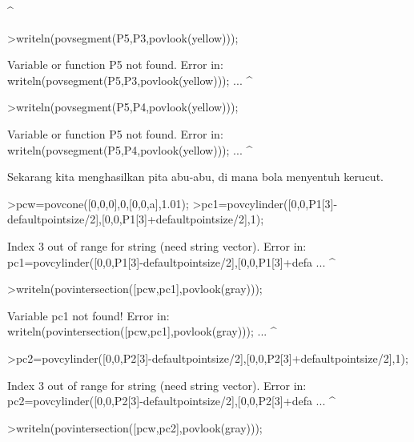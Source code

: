 \documentclass[a4paper,10pt]{article}
\begin{document}
\begin{eulernotebook}
\begin{eulercomment}
\begin{eulercomment}
\begin{eulercomment}
\begin{eulercomment}
\begin{eulercomment}
\begin{eulercomment}
\begin{eulercomment}
\begin{eulercomment}
\begin{eulercomment}
\begin{eulercomment}
\begin{eulercomment}
\begin{eulercomment}
\begin{eulercomment}
\begin{eulercomment}
\begin{eulercomment}
\begin{eulercomment}
\begin{euleroutput}
                                           ^
\end{euleroutput}
\begin{eulerprompt}
>writeln(povsegment(P5,P3,povlook(yellow)));
\end{eulerprompt}
\begin{euleroutput}
  Variable or function P5 not found.
  Error in:
  writeln(povsegment(P5,P3,povlook(yellow))); ...
                       ^
\end{euleroutput}
\begin{eulerprompt}
>writeln(povsegment(P5,P4,povlook(yellow)));
\end{eulerprompt}
\begin{euleroutput}
  Variable or function P5 not found.
  Error in:
  writeln(povsegment(P5,P4,povlook(yellow))); ...
                       ^
\end{euleroutput}
\begin{eulercomment}
Sekarang kita menghasilkan pita abu-abu, di mana bola menyentuh
kerucut.
\end{eulercomment}
\begin{eulerprompt}
>pcw=povcone([0,0,0],0,[0,0,a],1.01);
>pc1=povcylinder([0,0,P1[3]-defaultpointsize/2],[0,0,P1[3]+defaultpointsize/2],1);
\end{eulerprompt}
\begin{euleroutput}
  Index 3 out of range for string (need string vector).
  Error in:
  pc1=povcylinder([0,0,P1[3]-defaultpointsize/2],[0,0,P1[3]+defa ...
                            ^
\end{euleroutput}
\begin{eulerprompt}
>writeln(povintersection([pcw,pc1],povlook(gray)));
\end{eulerprompt}
\begin{euleroutput}
  Variable pc1 not found!
  Error in:
  writeln(povintersection([pcw,pc1],povlook(gray))); ...
                                  ^
\end{euleroutput}
\begin{eulerprompt}
>pc2=povcylinder([0,0,P2[3]-defaultpointsize/2],[0,0,P2[3]+defaultpointsize/2],1);
\end{eulerprompt}
\begin{euleroutput}
  Index 3 out of range for string (need string vector).
  Error in:
  pc2=povcylinder([0,0,P2[3]-defaultpointsize/2],[0,0,P2[3]+defa ...
                            ^
\end{euleroutput}
\begin{eulerprompt}
>writeln(povintersection([pcw,pc2],povlook(gray)));

\end{eulerprompt}
\end{eulercomment}
\end{eulercomment}
\end{eulercomment}
\end{eulercomment}
\end{eulercomment}
\end{eulercomment}
\end{eulercomment}
\end{eulercomment}
\end{eulercomment}
\end{eulercomment}
\end{eulercomment}
\end{eulercomment}
\end{eulercomment}
\end{eulercomment}
\end{eulercomment}
\end{eulercomment}
\end{eulernotebook}
\end{document}

